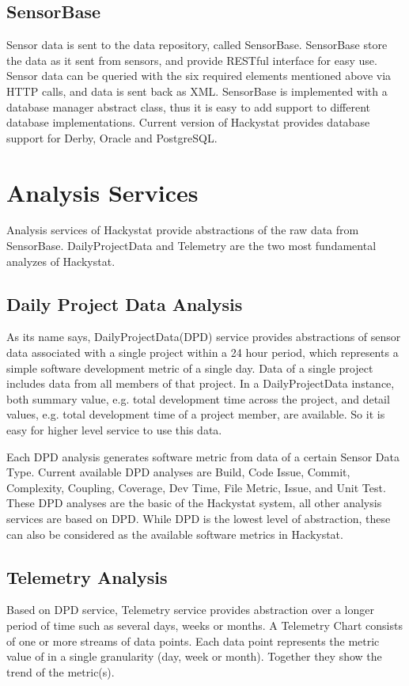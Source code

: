 \subsection{SensorBase}
Sensor data is sent to the data repository, called SensorBase. SensorBase store the data as it sent from sensors, and provide RESTful interface for easy use. Sensor data can be queried with the six required elements mentioned above via HTTP calls, and data is sent back as XML. SensorBase is implemented with a database manager abstract class, thus it is easy to add support to different database implementations. Current version of Hackystat provides database support for Derby, Oracle and PostgreSQL.

\section{Analysis Services}
Analysis services of Hackystat provide abstractions of the raw data from SensorBase. DailyProjectData and Telemetry are the two most fundamental analyzes of Hackystat.

\subsection{Daily Project Data Analysis}
As its name says, DailyProjectData(DPD) service provides abstractions of sensor data associated with a single project within a 24 hour period, which represents a simple software development metric of a single day. Data of a single project includes data from all members of that project. In a DailyProjectData instance, both summary value, e.g. total development time across the project, and detail values, e.g. total development time of a project member, are available. So it is easy for higher level service to use this data.

Each DPD analysis generates software metric from data of a certain Sensor Data Type. Current available DPD analyses are Build, Code Issue, Commit, Complexity, Coupling, Coverage, Dev Time, File Metric, Issue, and Unit Test. These DPD analyses are the basic of the Hackystat system, all other analysis services are based on DPD. While DPD is the lowest level of abstraction, these can also be considered as the available software metrics in Hackystat.

\subsection{Telemetry Analysis}
Based on DPD service, Telemetry service provides abstraction over a longer period of time such as several days, weeks or months. A Telemetry Chart consists of one or more streams of data points. Each data point represents the metric value of in a single granularity (day, week or month). Together they show the trend of the metric(s).

